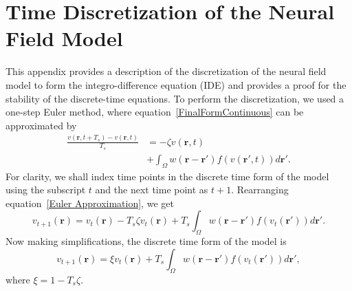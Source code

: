 \documentclass[review,authoryear,3p]{elsarticle}
\begin{document}
\section{Time Discretization of the Neural Field Model}
\label{App:Time Discretization} This appendix provides a description of the discretization of the neural field model to form the integro-difference equation (IDE) and provides a proof for the stability of the discrete-time equations. To perform the discretization, we used a one-step Euler method, where equation~\ref{FinalFormContinuous} can be approximated by 
\begin{align}
	\label{Euler Approximation}\frac{v\left( \mathbf{r},t+T_s \right) - v\left( \mathbf{r},t\right)}{T_s} &=-\zeta v\left( \mathbf{r},t \right) \nonumber \\ 
&+ \int_\Omega {w\left( \mathbf{r}-\mathbf{r}' \right)f\left( {v\left( \mathbf{r}',t \right)} \right)d\mathbf{r}'}. 
\end{align}
For clarity, we shall index time points in the discrete time form of the model using the subscript $t$ and the next time point as $t+1$. Rearranging equation~\ref{Euler Approximation}, we get 
\begin{equation}
	\label{Euler Approximation2} v_{t+1}\left( \mathbf{r}\right) = v_t\left( \mathbf{r}\right) -T_s \zeta v_t\left( \mathbf{r}\right) + T_s \int_\Omega {w\left( \mathbf{r}-\mathbf{r}' \right)f\left( {v_t\left( \mathbf{r}'\right)} \right)d\mathbf{r}'}. 
\end{equation}
Now making simplifications, the discrete time form of the model is 
\begin{equation}
	\label{Discrete Time Model1}v_{t+1}\left(\mathbf{r}\right) = \xi v_t\left(\mathbf{r}\right) + T_s \int_\Omega { w\left(\mathbf{r}-\mathbf{r}'\right) f\left(v_t\left(\mathbf{r}'\right)\right) d\mathbf{r}'}, 
\end{equation}
where $\xi = 1 - T_s \zeta$.
\end{document}
